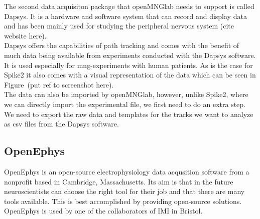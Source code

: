 The second data acquisiton package that openMNGlab needs to support is called Dapsys. It is a hardware and software system that can record and display data and has been mainly used for studying the peripheral nervous system (cite website here).\\
Dapsys offers the capabilities of path tracking and comes with the benefit of much data being available from experiments conducted with the Dapsys software. It is used especially for mng-experiments with human patients. As is the case for Spike2 it also comes with a visual representation of the data which can be seen in Figure~(put ref to screenshot here).\\
The data can also be imported by openMNGlab, however, unlike Spike2, where we can directly import the experimental file, we first need to do an extra step. We need to export the raw data and templates for the tracks we want to analyze as csv files from the Dapsys software.\\


\subsection{OpenEphys}
OpenEphys is an open-source electrophysiology data acqusition software from a nonprofit based in Cambridge, Massachusetts. Its aim is that in the future neuroscientists can choose the right tool for their job and that there are many tools available. This is best accomplished by providing open-source solutions.
OpenEphys is used by one of the collaborators of IMI in Bristol.

 
\cleardoublepage
